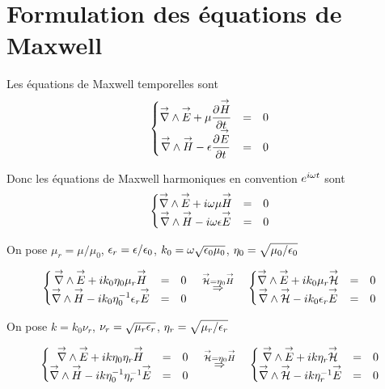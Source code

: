 \section{Formulation des équations de Maxwell}
\label{sec:annex:maxwell_equation}

Les équations de Maxwell temporelles sont
\begin{equation}
  \left\lbrace \begin{matrix}
  \vrot \vE + \mu \ddr{t}{\vect{H}} &=& 0 \\
  \vrot \vect{H} - \eps \ddr{t}{\vE} &=& 0 \\
  \end{matrix} \right.
\end{equation}

Donc les équations de Maxwell harmoniques en convention \(e^{i\w t}\) sont
\begin{equation}
  \left\lbrace \begin{matrix}
  \vrot \vE + i\w\mu \vect{H} &=& 0 \\
  \vrot \vect{H} - i\w\eps \vE &=& 0 \\
  \end{matrix} \right.
\end{equation}

On pose \(\mu_r = \mu \slash \mu_0\), \(\eps_r = \eps \slash \eps_0\), \(k_0 = \w \sqrt {\eps_0\mu_0}\), \(\eta_0=\sqrt {\mu_0/\eps_0}\)

\begin{equation}
\left\lbrace \begin{matrix}
\vrot \vE + ik_0\eta_0\mu_r \vect{H} &=& 0 \\
\vrot \vect{H} - ik_0\eta_0^{-1}\eps_r \vE &=& 0 \\
\end{matrix} \right.
\quad
\overset{\mathcal{\vH} = \eta_0 \vect{H}}{\Rightarrow}
\quad
\left\lbrace \begin{matrix}
\vrot \vE + ik_0\mu_r \mathcal{\vH} &=& 0 \\
\vrot \mathcal{\vH} - ik_0\eps_r \vE &=& 0 \\
\end{matrix} \right.
\end{equation}

On pose \(k=k_0\nu_r\), \(\nu_r = \sqrt{\mu_r\eps_r}\), \(\eta_r = \sqrt{\mu_r \slash \eps_r}\)

\begin{equation}
\left\lbrace \begin{matrix}
\vrot \vE + ik\eta_0\eta_r \vect{H} &=& 0 \\
\vrot \vect{H} - ik\eta_0^{-1}\eta_r^{-1} \vE &=& 0 \\
\end{matrix} \right.
\quad
\overset{\mathcal{\vH} = \eta_0 \vect{H}}{\Rightarrow}
\quad
\left\lbrace \begin{matrix}
\vrot \vE + ik\eta_r \mathcal{\vH} &=& 0 \\
\vrot \mathcal{\vH} - ik\eta_r^{-1} \vE &=& 0 \\
\end{matrix} \right.
\end{equation}